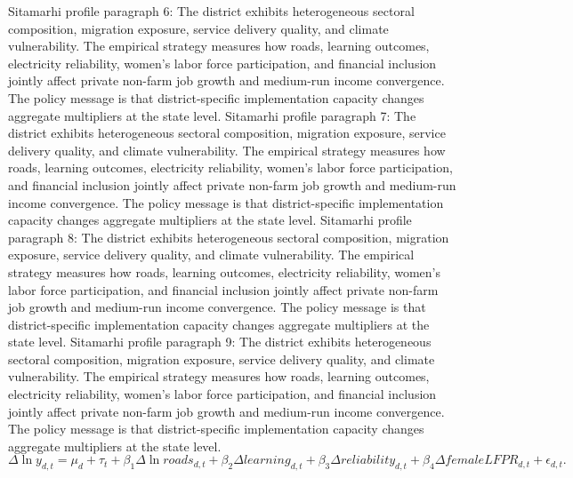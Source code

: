 \documentclass[preprint,12pt]{elsarticle}
\begin{document}
Sitamarhi profile paragraph 6: The district exhibits heterogeneous sectoral composition, migration exposure, service delivery quality, and climate vulnerability. The empirical strategy measures how roads, learning outcomes, electricity reliability, women's labor force participation, and financial inclusion jointly affect private non-farm job growth and medium-run income convergence. The policy message is that district-specific implementation capacity changes aggregate multipliers at the state level.
Sitamarhi profile paragraph 7: The district exhibits heterogeneous sectoral composition, migration exposure, service delivery quality, and climate vulnerability. The empirical strategy measures how roads, learning outcomes, electricity reliability, women's labor force participation, and financial inclusion jointly affect private non-farm job growth and medium-run income convergence. The policy message is that district-specific implementation capacity changes aggregate multipliers at the state level.
Sitamarhi profile paragraph 8: The district exhibits heterogeneous sectoral composition, migration exposure, service delivery quality, and climate vulnerability. The empirical strategy measures how roads, learning outcomes, electricity reliability, women's labor force participation, and financial inclusion jointly affect private non-farm job growth and medium-run income convergence. The policy message is that district-specific implementation capacity changes aggregate multipliers at the state level.
Sitamarhi profile paragraph 9: The district exhibits heterogeneous sectoral composition, migration exposure, service delivery quality, and climate vulnerability. The empirical strategy measures how roads, learning outcomes, electricity reliability, women's labor force participation, and financial inclusion jointly affect private non-farm job growth and medium-run income convergence. The policy message is that district-specific implementation capacity changes aggregate multipliers at the state level.
\begin{equation}\Delta \ln y_{d,t}=\mu_d+\tau_t+\beta_1\Delta\ln roads_{d,t}+\beta_2\Delta learning_{d,t}+\beta_3\Delta reliability_{d,t}+\beta_4\Delta femaleLFPR_{d,t}+\epsilon_{d,t}.\end{equation}
\end{document}
